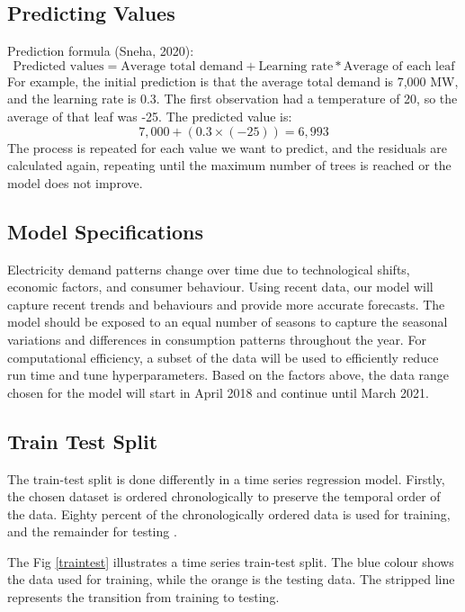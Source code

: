 \documentclass[mstat,12pt]{unswthesis}
\begin{document}
\subsection{Predicting Values}\label{predicting-values}

Prediction formula (Sneha, 2020): \[
\text{Predicted values} = \text{Average total demand} + \text{Learning rate} * \text{Average of each leaf}
\] For example, the initial prediction is that the average total demand
is 7,000 MW, and the learning rate is 0.3. The first observation had a
temperature of 20, so the average of that leaf was -25. The predicted
value is: \[
7,000 + (0.3 \times (-25)) = 6,993
\] The process is repeated for each value we want to predict, and the
residuals are calculated again, repeating until the maximum number of
trees is reached or the model does not improve.

\subsection{Model Specifications}\label{model-specifications}

Electricity demand patterns change over time due to technological
shifts, economic factors, and consumer behaviour. Using recent data, our
model will capture recent trends and behaviours and provide more
accurate forecasts. The model should be exposed to an equal number of
seasons to capture the seasonal variations and differences in
consumption patterns throughout the year. For computational efficiency,
a subset of the data will be used to efficiently reduce run time and
tune hyperparameters. Based on the factors above, the data range chosen
for the model will start in April 2018 and continue until March 2021.

\subsection{Train Test Split}\label{train-test-split}

The train-test split is done differently in a time series regression
model. Firstly, the chosen dataset is ordered chronologically to
preserve the temporal order of the data. Eighty percent of the
chronologically ordered data is used for training, and the remainder for
testing \cite{brownlee_2020_how}.

The Fig \ref{traintest} illustrates a time series train-test split. The
blue colour shows the data used for training, while the orange is the
testing data. The stripped line represents the transition from training
to testing.
\end{document}
